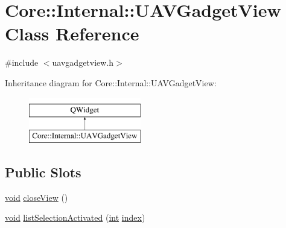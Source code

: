 \hypertarget{class_core_1_1_internal_1_1_u_a_v_gadget_view}{\section{Core\-:\-:Internal\-:\-:U\-A\-V\-Gadget\-View Class Reference}
\label{class_core_1_1_internal_1_1_u_a_v_gadget_view}
}


{\ttfamily \#include $<$uavgadgetview.\-h$>$}

Inheritance diagram for Core\-:\-:Internal\-:\-:U\-A\-V\-Gadget\-View\-:\begin{figure}[H]
\begin{center}
\leavevmode
\includegraphics[height=2.000000cm]{class_core_1_1_internal_1_1_u_a_v_gadget_view}
\end{center}
\end{figure}
\subsection*{Public Slots}
\begin{DoxyCompactItemize}
\item 
\hyperlink{group___u_a_v_objects_plugin_ga444cf2ff3f0ecbe028adce838d373f5c}{void} \hyperlink{group___core_plugin_gaff786c8d73de45a91dd8d696e60ccf7d}{close\-View} ()
\item 
\hyperlink{group___u_a_v_objects_plugin_ga444cf2ff3f0ecbe028adce838d373f5c}{void} \hyperlink{group___core_plugin_gab260059975a562d321095827fa8de699}{list\-Selection\-Activated} (\hyperlink{ioapi_8h_a787fa3cf048117ba7123753c1e74fcd6}{int} \hyperlink{glext_8h_ab47dd9958bcadea08866b42bf358e95e}{index})
\end{DoxyCompactItemize}
